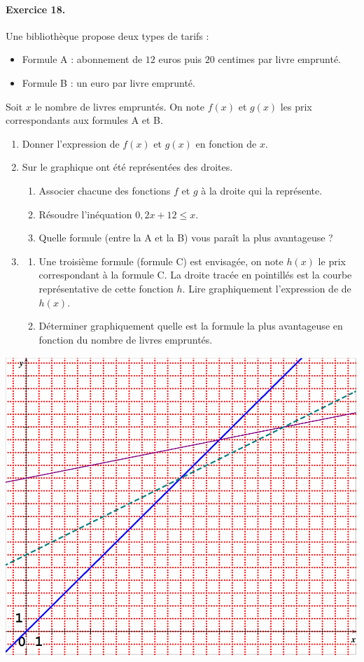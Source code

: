 \documentclass[11pt]{article}
\begin{document}
\paragraph{Exercice 18.} Une bibliothèque propose deux types de tarifs :
\begin{itemize}
  \item Formule A : abonnement de $12$ euros puis $20$ centimes par livre
    emprunté.
  \item Formule B : un euro par livre emprunté.
\end{itemize}
Soit $x$ le nombre de livres empruntés. On note $f(x)$ et $g(x)$ les prix
correspondants aux formules A et B.
\begin{enumerate}
  \item Donner l'expression de $f(x)$ et $g(x)$ en fonction de $x$.
  \item Sur le graphique ont été représentées des droites.
    \begin{enumerate}
      \item Associer chacune des fonctions $f$ et $g$ à la droite qui la
        représente.
      \item Résoudre l'inéquation $0,2x+12\leq x$.
      \item Quelle formule (entre la A et la B) vous paraît la plus avantageuse
        ?
    \end{enumerate}
  \item \begin{enumerate}
      \item Une troisième formule (formule C) est envisagée, on note $h(x)$ le
        prix correspondant à la formule C. La droite tracée en pointillés est la
        courbe représentative de cette fonction $h$. Lire graphiquement
        l'expression de de $h(x)$.
      \item Déterminer graphiquement quelle est la formule la plus avantageuse
        en fonction du nombre de livres empruntés.
    \end{enumerate}
\end{enumerate}
\begin{center}
  \includegraphics[scale=.4]{pb1.png}
\end{center}
\end{document}
